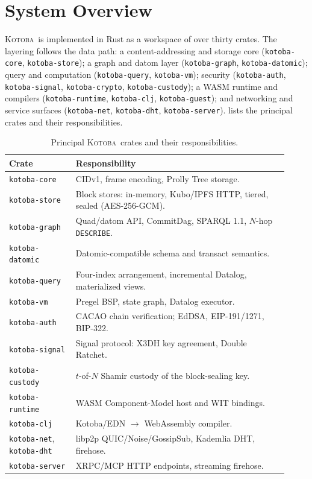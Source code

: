 \documentclass[11pt]{article}
\newcommand{\kotoba}{\textsc{Kotoba}}
\begin{document}
\section{System Overview}
\label{sec:overview}

\kotoba\ is implemented in Rust as a workspace of over thirty crates. The
layering follows the data path: a content-addressing and storage core
(\texttt{kotoba-core}, \texttt{kotoba-store}); a graph and datom layer
(\texttt{kotoba-graph}, \texttt{kotoba-datomic}); query and computation
(\texttt{kotoba-query}, \texttt{kotoba-vm}); security
(\texttt{kotoba-auth}, \texttt{kotoba-signal}, \texttt{kotoba-crypto},
\texttt{kotoba-custody}); a WASM runtime and compilers
(\texttt{kotoba-runtime}, \texttt{kotoba-clj}, \texttt{kotoba-guest}); and
networking and service surfaces (\texttt{kotoba-net}, \texttt{kotoba-dht},
\texttt{kotoba-server}).  lists the principal crates and their
responsibilities.

\begin{table}[t]
\centering
\small
\caption{Principal \kotoba\ crates and their responsibilities.}
\label{tab:crates}
\begin{tabular}{@{}p{0.22\linewidth} p{0.70\linewidth}@{}}
\toprule
\textbf{Crate} & \textbf{Responsibility} \\
\midrule
\texttt{kotoba-core}    & CIDv1, frame encoding, Prolly Tree storage. \\
\texttt{kotoba-store}   & Block stores: in-memory, Kubo/IPFS HTTP, tiered, sealed (AES-256-GCM). \\
\texttt{kotoba-graph}   & Quad/datom API, CommitDag, SPARQL 1.1, $N$-hop \texttt{DESCRIBE}. \\
\texttt{kotoba-datomic} & Datomic-compatible schema and transact semantics. \\
\texttt{kotoba-query}   & Four-index arrangement, incremental Datalog, materialized views. \\
\texttt{kotoba-vm}      & Pregel BSP, state graph, Datalog executor. \\
\texttt{kotoba-auth}    & CACAO chain verification; EdDSA, EIP-191/1271, BIP-322. \\
\texttt{kotoba-signal}  & Signal protocol: X3DH key agreement, Double Ratchet. \\
\texttt{kotoba-custody} & $t$-of-$N$ Shamir custody of the block-sealing key. \\
\texttt{kotoba-runtime} & WASM Component-Model host and WIT bindings. \\
\texttt{kotoba-clj}     & Kotoba/EDN $\rightarrow$ WebAssembly compiler. \\
\texttt{kotoba-net}, \texttt{kotoba-dht} & libp2p QUIC/Noise/GossipSub, Kademlia DHT, firehose. \\
\texttt{kotoba-server}  & XRPC/MCP HTTP endpoints, streaming firehose. \\
\bottomrule
\end{tabular}
\end{table}
\end{document}
